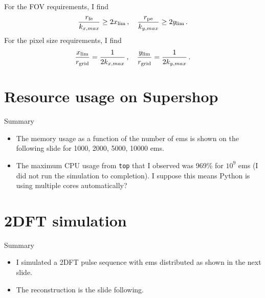 \documentclass[dvipsnames]{beamer}
\begin{document}
\begin{frame}
For the FOV requirements, I find
\begin{equation*}
\frac{r_{\rm fe}}{k_{x,max}} \geq 2x_{\rm lim}\,, \quad \frac{r_{\rm pe}}{k_{y,max}} \geq 2y_{\rm lim}\,.
\end{equation*}
For the pixel size requirements, I find
\begin{equation*}
\frac{x_{\rm lim}}{r_{\rm grid}} = \frac{1}{2k_{x,max}}\,, \quad \frac{y_{\rm lim}}{r_{\rm grid}} = \frac{1}{2k_{y,max}}\,.
\end{equation*}
\end{frame}

\section{Resource usage on Supershop}

\begin{frame}{Summary}
\begin{itemize}
\item The memory usage as a function of the number of ems is shown on the following slide for 1000, 2000, 5000, 10000 ems.
\item The maximum CPU usage from \texttt{top} that I observed was 969\% for $10^9$ ems (I did not run the simulation to completion). I suppose this means Python is using multiple cores automatically?
\end{itemize}
\end{frame}

\begin{frame}
\begin{center}
\texttt{[image: \{supershop\_resource\_usage]}}

1.8 kB per em
\end{center}
\end{frame}

\section{2DFT simulation}

\begin{frame}{Summary}
\begin{itemize}
\item I simulated a 2DFT pulse sequence with ems distributed as shown in the next slide.
\item The reconstruction is the slide following.
\end{itemize}
\end{frame}
\end{document}
